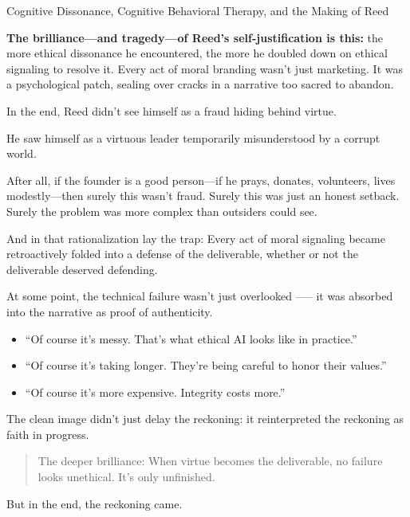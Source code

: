 \begin{HistoricalSidebar}{Cognitive Dissonance, Cognitive Behavioral Therapy, and the Making of Reed}
    \medskip
    
    \textbf{The brilliance—and tragedy—of Reed’s self-justification is this:} the more ethical dissonance he encountered, the more he doubled down on ethical signaling to resolve it. Every act of moral branding wasn’t just marketing. It was a psychological patch, sealing over cracks in a narrative too sacred to abandon.

    \medskip
    
    In the end, Reed didn’t see himself as a fraud hiding behind virtue.

    \medskip
    
    He saw himself as a virtuous leader temporarily misunderstood by a corrupt world.
    
\end{HistoricalSidebar}

\medskip

After all, if the founder is a good person—if he prays, donates, volunteers, lives modestly—then surely this wasn’t fraud.  
Surely this was just an honest setback.  
Surely the problem was more complex than outsiders could see.

And in that rationalization lay the trap: Every act of moral signaling became retroactively folded into a defense of the deliverable, whether or not the deliverable deserved defending.

At some point, the technical failure wasn’t just overlooked —-- it was absorbed into the narrative as proof of authenticity.

\begin{itemize}
    \item “Of course it’s messy. That’s what ethical AI looks like in practice.”  
    \item “Of course it’s taking longer. They’re being careful to honor their values.”  
    \item “Of course it’s more expensive. Integrity costs more.”
\end{itemize}

The clean image didn’t just delay the reckoning: it reinterpreted the reckoning as faith in progress.

\begin{quote}
The deeper brilliance: When virtue becomes the deliverable, no failure looks unethical. It’s only unfinished.
\end{quote}

\medskip

But in the end, the reckoning came.

